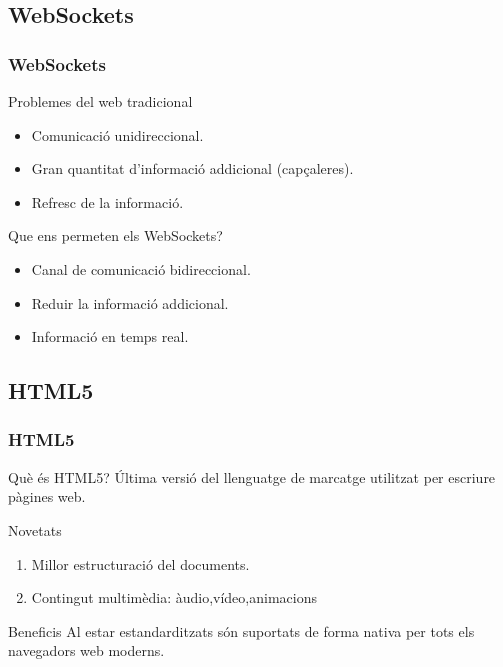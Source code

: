 \documentclass[notitlepage]{beamer}
\begin{document}
\subsection{WebSockets}
\begin{frame}
\frametitle{WebSockets}
\begin{block}{Problemes del web tradicional}
\begin{itemize}
    \item{Comunicació unidireccional.}
    \item{Gran quantitat d'informació addicional (capçaleres).}
    \item{Refresc de la informació.}
\end{itemize}
\end{block}

\begin{block}{Que ens permeten els WebSockets?}
\begin{itemize}
   \item{Canal de comunicació bidireccional.}
    \item{Reduir la informació addicional.}
    \item{Informació en temps real.}
\end{itemize}
\end{block}
\end{frame}

\subsection{HTML5}
\begin{frame}
\frametitle{HTML5}
\begin{block}{Què és HTML5?}
Última versió del llenguatge de marcatge utilitzat per escriure pàgines web.
\end{block}

\begin{block}{Novetats}
\begin{enumerate}
    \item{Millor estructuració del documents.}
    \item{Contingut multimèdia: àudio,vídeo,animacions}
\end{enumerate}
\end{block}

\begin{block}{Beneficis}
Al estar estandarditzats són suportats de forma nativa per tots els navegadors web moderns.
\end{block}
\end{frame}
\end{document}
